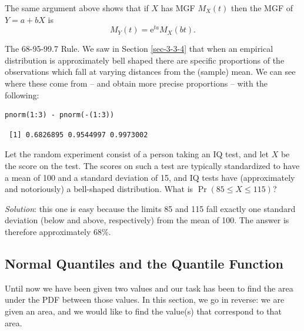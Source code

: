 \documentclass[captions=tableheading]{scrbook}
\begin{document}
\begin{fact}
The same argument above shows that if \(X\) has MGF \(M_{X}(t)\) then the MGF of \(Y=a+bX\) is
\begin{equation}
M_{Y}(t)=\mathrm{e}^{ta}M_{X}(bt).
\end{equation}
\end{fact}

\begin{example}
The 68-95-99.7 Rule. We saw in Section \ref{sec-3-3-4} that when an empirical distribution is approximately bell shaped there are specific proportions of the observations which fall at varying distances from the (sample) mean. We can see where these come from -- and obtain more precise proportions -- with the following:
\end{example}


\begin{verbatim}
pnorm(1:3) - pnorm(-(1:3))
\end{verbatim}

\begin{verbatim}
 [1] 0.6826895 0.9544997 0.9973002
\end{verbatim}

\begin{example}
Let the random experiment consist of a person taking an IQ test, and let \(X\) be the score on the test. The scores on such a test are typically standardized to have a mean of 100 and a standard deviation of 15, and IQ tests have (approximately and notoriously) a bell-shaped distribution. What is \(\Pr(85\leq X\leq115)\)?

\emph{Solution}: this one is easy because the limits 85 and 115 fall exactly one standard deviation (below and above, respectively) from the mean of 100. The answer is therefore approximately 68\%.
\end{example}
\subsection{Normal Quantiles and the Quantile Function}
\label{sec-6-3-1}
\label{sub-Normal-Quantiles-QF}


Until now we have been given two values and our task has been to find the area under the PDF between those values. In this section, we go in reverse: we are given an area, and we would like to find the value(s) that correspond to that area. 
\end{document}
